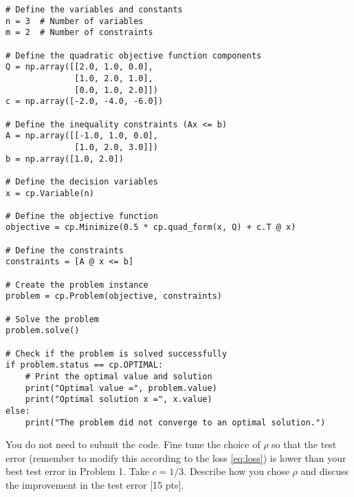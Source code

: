 \documentclass[12pt]{article}
\begin{document}
\begin{itemize}
\begin{lstlisting}
# Define the variables and constants
n = 3  # Number of variables
m = 2  # Number of constraints

# Define the quadratic objective function components
Q = np.array([[2.0, 1.0, 0.0],
              [1.0, 2.0, 1.0],
              [0.0, 1.0, 2.0]])
c = np.array([-2.0, -4.0, -6.0])

# Define the inequality constraints (Ax <= b)
A = np.array([[-1.0, 1.0, 0.0],
              [1.0, 2.0, 3.0]])
b = np.array([1.0, 2.0])

# Define the decision variables
x = cp.Variable(n)

# Define the objective function
objective = cp.Minimize(0.5 * cp.quad_form(x, Q) + c.T @ x)

# Define the constraints
constraints = [A @ x <= b]

# Create the problem instance
problem = cp.Problem(objective, constraints)

# Solve the problem
problem.solve()

# Check if the problem is solved successfully
if problem.status == cp.OPTIMAL:
    # Print the optimal value and solution
    print("Optimal value =", problem.value)
    print("Optimal solution x =", x.value)
else:
    print("The problem did not converge to an optimal solution.")

\end{lstlisting}
You do not need to submit the code. Fine tune the choice of $\rho$ so that the test error (remember to modify this according to the loss \eqref{eq:loss}) is lower than your best test error in Problem 1. Take $c = 1/3.$ Describe how you chose $\rho$ and discuss the improvement in the test error [15 pts].
\end{itemize}
\end{document}
